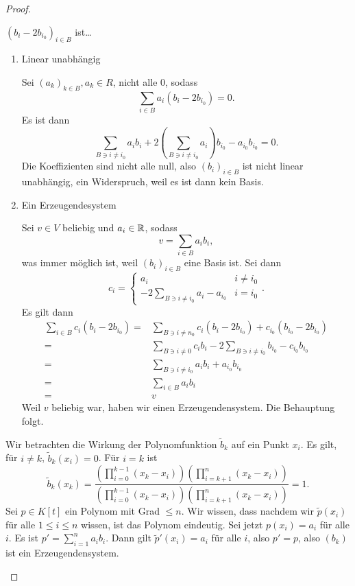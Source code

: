 \begin{proof}
	\begin{parts}
	\item $(b_i-2b_{i_0})_{i\in B}$ ist\ldots
		\begin{enumerate}[label=(\roman*)]
			\item Linear unabhängig

				Sei $(a_k)_{k\in B},a_k\in R$, nicht alle $0$, sodass
				\[
					\sum_{i\in B}a_i(b_i-2b_{i_0})=0
				.\] 
				Es ist dann
				\[
					\sum_{B\ni i\neq i_0}a_i b_i+2\left( \sum_{B\ni i\neq i_0}a_i \right) b_{i_0}-a_{i_0}b_{i_0}=0
				.\] 
				Die Koeffizienten sind nicht alle null, also $(b_i)_{i\in B}$ ist nicht linear unabhängig, ein Widerspruch, weil es ist dann kein Basis.
			\item Ein Erzeugendesystem

				Sei $v\in V$ beliebig und $a_i\in \mathbb{R}$, sodass
				\[
					v=\sum_{i\in B} a_i b_i
				,\] 
				was immer möglich ist, weil $(b_i)_{i\in B}$ eine Basis ist. Sei dann 
				\[
				c_i=\begin{cases}
					a_i & i \neq i_0\\
					-2\sum_{B\ni i\neq i_0} a_i-a_{i_0} & i=i_0
				\end{cases}
				.\] 
				Es gilt dann
				\begin{align*}
					\sum_{i\in B} c_i (b_i-2b_{i_0})=&\sum_{B\ni i\neq n_0}c_i (b_i-2b_{i_0}) + c_{i_0}(b_{i_0}-2b_{i_0})\\
						=&\sum_{B\ni i\neq 0}c_i b_i - 2\sum_{B\ni i\neq i_0} b_{i_0}-c_{i_0}b_{i_0}\\
						=&\sum_{B\ni i \neq i_0} a_ib_i+a_{i_0}b_{i_0}\\
						=&\sum_{i\in B }a_i b_i\\
						=& v
				\end{align*}
				Weil $v$ beliebig war, haben wir einen Erzeugendensystem. Die Behauptung folgt.
		\end{enumerate}
	\item Wir betrachten die Wirkung der Polynomfunktion $\tilde{b}_k$ auf ein Punkt $x_i$. Es gilt, f\"{u}r $i\neq k$, $\tilde{b}_k(x_i)=0$. F\"{u}r $i=k$ ist
		\[
			\tilde{b}_k(x_k)=\frac{\left(\prod_{i=0}^{k-1}(x_k-x_i)\right) \left(\prod_{i=k+1}^{n}(x_k-x_i) \right) }{\left(\prod_{i=0}^{k-1}(x_k-x_i)\right) \left(\prod_{i=k+1}^{n}(x_k-x_i) \right) }=1
		.\]
		Sei $p\in K[t]$ ein Polynom mit Grad $\le n$. Wir wissen, dass nachdem wir $\tilde{p}(x_i)$ f\"{u}r alle $1\le i\le n$ wissen, ist das Polynom eindeutig. Sei jetzt $p(x_i)=a_i$ f\"{u}r alle $i$. Es ist $p'=\sum_{i=1}^n a_i b_i$. Dann gilt $\tilde{p}'(x_i)=a_i$ f\"{u}r alle $i$, also $p'=p$, also $(b_k)$ ist ein Erzeugendensystem.


\end{parts}
\end{proof}
